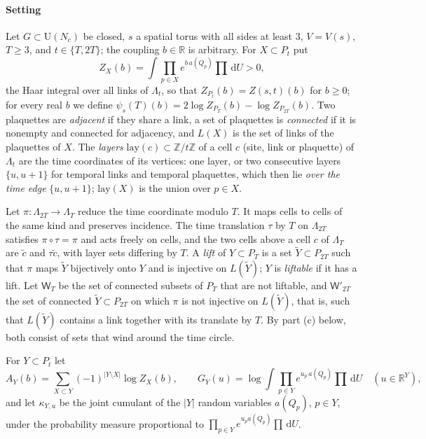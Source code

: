 \documentclass[11pt,a4paper]{amsart}
\theoremstyle{definition}
\theoremstyle{remark}
\numberwithin{equation}{section}
\newcommand{\R}{\mathbb{R}}          %
\newcommand{\Z}{\mathbb{Z}}          %
\newcommand{\abs}[1]{\lvert #1\rvert}      %
\newcommand{\dd}{\,\mathrm{d}}             %
\newcommand{\U}{\mathrm{U}}                %
\newcommand{\Zpart}[2]{Z(#1,#2)}           %
\newcommand{\psiT}[2]{\psi_{#1}(#2)}       %
\newcommand{\Vol}[1]{V(#1)}                %
\begin{document}
\paragraph{Setting}
Let $G\subset\U(N_c)$ be closed, $s$ a spatial torus with all sides at least $3$, $V=\Vol{s}$, $T\ge3$, and $t\in\{T,2T\}$; the coupling $b\in\R$ is arbitrary. For $X\subset P_t$ put
\[
Z_X(b)=\int\prod_{p\in X}e^{b\,a(Q_p)}\prod\dd U>0,
\]
the Haar integral over all links of $\Lambda_t$, so that $Z_{P_t}(b)=\Zpart{s}{t}(b)$ for $b\ge0$; for every real $b$ we define $\psiT{s}{T}(b)=2\log Z_{P_T}(b)-\log Z_{P_{2T}}(b)$. Two plaquettes are \emph{adjacent} if they share a link, a set of plaquettes is \emph{connected} if it is nonempty and connected for adjacency, and $L(X)$ is the set of links of the plaquettes of $X$. The \emph{layers} $\mathrm{lay}(c)\subset\Z/t\Z$ of a cell $c$ (site, link or plaquette) of $\Lambda_t$ are the time coordinates of its vertices: one layer, or two consecutive layers $\{u,u+1\}$ for temporal links and temporal plaquettes, which then lie \emph{over the time edge} $\{u,u+1\}$; $\mathrm{lay}(X)$ is the union over $p\in X$.

Let $\pi\colon\Lambda_{2T}\to\Lambda_T$ reduce the time coordinate modulo $T$. It maps cells to cells of the same kind and preserves incidence. The time translation $\tau$ by $T$ on $\Lambda_{2T}$ satisfies $\pi\circ\tau=\pi$ and acts freely on cells, and the two cells above a cell $c$ of $\Lambda_T$ are $\tilde c$ and $\tau\tilde c$, with layer sets differing by $T$. A \emph{lift} of $Y\subset P_T$ is a set $\tilde Y\subset P_{2T}$ such that $\pi$ maps $\tilde Y$ bijectively onto $Y$ and is injective on $L(\tilde Y)$; $Y$ is \emph{liftable} if it has a lift. Let $\mathsf W_T$ be the set of connected subsets of $P_T$ that are not liftable, and $\mathsf W'_{2T}$ the set of connected $\tilde Y\subset P_{2T}$ on which $\pi$ is not injective on $L(\tilde Y)$, that is, such that $L(\tilde Y)$ contains a link together with its translate by $T$. By part (c) below, both consist of sets that wind around the time circle.

For $Y\subset P_t$ let
\begin{equation}\label{eq:winding-activity}
A_Y(b)=\sum_{X\subset Y}(-1)^{\abs{Y\setminus X}}\log Z_X(b),\qquad G_Y(u)=\log\int\prod_{p\in Y}e^{u_p\,a(Q_p)}\prod\dd U\quad(u\in\R^Y),
\end{equation}
and let $\kappa_{Y,u}$ be the joint cumulant of the $\abs{Y}$ random variables $a(Q_p)$, $p\in Y$, under the probability measure proportional to $\prod_{p\in Y}e^{u_pa(Q_p)}\prod\dd U$.
\end{document}
